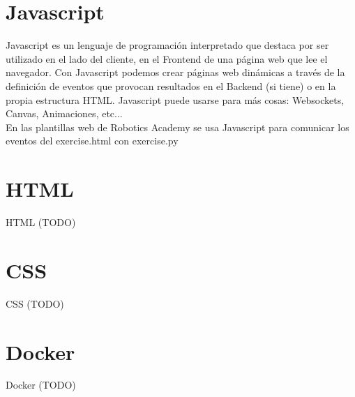 \section{Javascript}
\label{sec:javascript}

Javascript es un lenguaje de programación interpretado que destaca por ser utilizado en el lado del cliente, en el Frontend de una página web que lee el navegador. Con Javascript podemos crear páginas web dinámicas a través de la definición de eventos que provocan resultados en el Backend (si tiene) o en la propia estructura HTML. Javascript puede usarse para más cosas: Websockets, Canvas, Animaciones, etc...\\

En las plantillas web de Robotics Academy se usa Javascript para comunicar los eventos del exercise.html con exercise.py

\section{HTML}
\label{sec:html}

HTML (TODO)

\section{CSS}
\label{sec:css}

CSS (TODO)

\section{Docker}
\label{sec:docker}

Docker (TODO)
